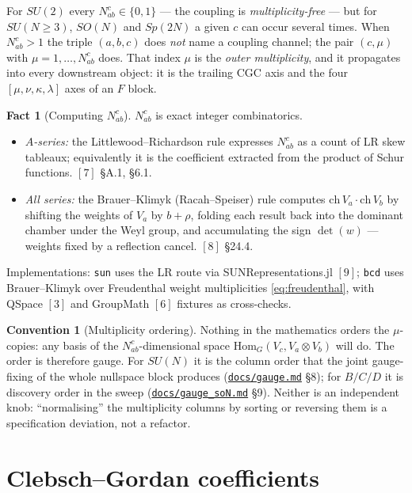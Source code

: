 \documentclass[11pt,a4paper]{article}
\theoremstyle{plain}
\theoremstyle{definition}
\newtheorem{fact}[theorem]{Fact}
\newtheorem{convention}[theorem]{Convention}
\newcommand{\Hom}{\mathrm{Hom}}
\newcommand{\code}[1]{\texttt{#1}}
\newcommand{\gaugemd}{\href{https://github.com/Ryo-wtnb11/racah/blob/main/docs/gauge.md}{\code{docs/gauge.md}}}
\newcommand{\gaugeson}{\href{https://github.com/Ryo-wtnb11/racah/blob/main/docs/gauge_soN.md}{\code{docs/gauge\_soN.md}}}
\begin{document}
For $SU(2)$ every $N^c_{ab}\in\{0,1\}$ --- the coupling is
\emph{multiplicity-free} --- but for $SU(N\ge 3)$, $SO(N)$ and $Sp(2N)$ a given
$c$ can occur several times. When $N^c_{ab}>1$ the triple $(a,b,c)$ does
\emph{not} name a coupling channel; the pair $(c,\mu)$ with
$\mu=1,\dots,N^c_{ab}$ does. That index $\mu$ is the \emph{outer multiplicity},
and it propagates into every downstream object: it is the trailing CGC axis and
the four $[\mu,\nu,\kappa,\lambda]$ axes of an $F$ block.

\begin{fact}[Computing $N^c_{ab}$]\label{fact:nab}
$N^c_{ab}$ is exact integer combinatorics.
\begin{itemize}[leftmargin=1.4em]
  \item \emph{$A$-series:} the Littlewood--Richardson rule expresses
    $N^c_{ab}$ as a count of LR skew tableaux; equivalently it is the
    coefficient extracted from the product of Schur functions. $[7]$ \S A.1,
    \S6.1.
  \item \emph{All series:} the Brauer--Klimyk (Racah--Speiser) rule computes
    $\mathrm{ch}\,V_a\cdot\mathrm{ch}\,V_b$ by shifting the weights of $V_a$ by
    $b+\rho$, folding each result back into the dominant chamber under the
    Weyl group, and accumulating the sign $\det(w)$ --- weights fixed by a
    reflection cancel. $[8]$ \S24.4.
\end{itemize}
\end{fact}

Implementations: \code{sun} uses the LR route via
SUNRepresentations.jl $[9]$; \code{bcd} uses Brauer--Klimyk over
Freudenthal weight multiplicities \eqref{eq:freudenthal}, with
QSpace $[3]$ and GroupMath $[6]$ fixtures as cross-checks.

\begin{convention}[Multiplicity ordering]
Nothing in the mathematics orders the $\mu$-copies: any basis of the
$N^c_{ab}$-dimensional space $\Hom_G(V_c,V_a\otimes V_b)$ will do. The order is
therefore gauge. For $SU(N)$ it is the column order that the joint
gauge-fixing of the whole nullspace block produces (\gaugemd{} \S8); for
$B/C/D$ it is discovery order in the sweep (\gaugeson{} \S9). Neither is an
independent knob: ``normalising'' the multiplicity columns by sorting or
reversing them is a specification deviation, not a refactor.
\end{convention}

\section{Clebsch--Gordan coefficients}
\label{sec:cgc}
\end{document}
